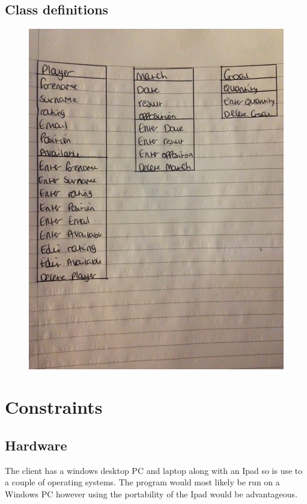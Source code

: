 \subsection{Class definitions}
\begin{figure}[H]
	\includegraphics[width=200mm]{classdef}
\end{figure}


\section{Constraints}

\subsection{Hardware}
The client has a windows desktop PC and laptop along with an Ipad so is use to a couple of operating systems. The program would most likely be run on a Windows PC however using the portability of the Ipad would be advantageous.
